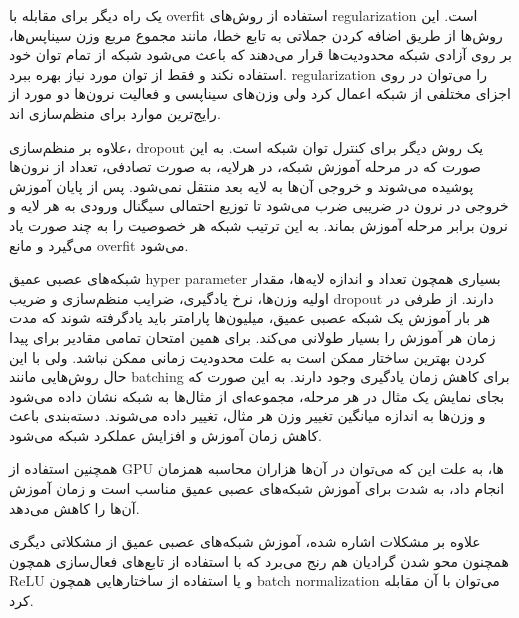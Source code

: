 یک راه دیگر برای مقابله با \gls{overfit} استفاده از روش‌های \gls{regularization}
است. این روش‌ها از طریق اضافه کردن جملاتی به تابع خطا، مانند مجموع مربع وزن
سیناپس‌ها، بر روی آزادی شبکه محدودیت‌ها قرار می‌دهند که باعث می‌شود شبکه از تمام
توان خود استفاده نکند و فقط از توان مورد نیاز بهره ببرد. \gls{regularization} را
می‌توان در روی اجزای مختلفی از شبکه اعمال کرد ولی وزن‌های سیناپسی و فعالیت
نرون‌ها دو مورد از رایج‌ترین موارد برای منظم‌سازی اند.

علاوه بر منظم‌سازی، dropout یک روش دیگر برای کنترل توان شبکه است. به این صورت که
در مرحله آموزش شبکه، در هرلایه، به صورت تصادفی، تعداد از نرون‌ها پوشیده می‌شوند
و خروجی آن‌ها به لایه بعد منتقل نمی‌شود. پس از پایان آموزش خروجی در نرون در
ضریبی ضرب می‌شود تا توزیع احتمالی سیگنال ورودی به هر لایه و نرون برابر مرحله
آموزش بماند. به این ترتیب شبکه‌ هر خصوصیت را به چند صورت یاد می‌گیرد و مانع
\gls{overfit} می‌شود.

شبکه‌های عصبی عمیق \gls{hyper parameter} بسیاری همچون تعداد و اندازه لایه‌ها،
مقدار اولیه وزن‌ها، نرخ یادگیری، ضرایب منظم‌سازی و ضریب dropout دارند. از طرفی
در هر بار آموزش یک شبکه عصبی عمیق، میلیون‌ها پارامتر باید یادگرفته شوند که مدت
زمان هر آموزش را بسیار طولانی می‌کند. برای همین امتحان تمامی مقادیر برای پیدا
کردن بهترین ساختار ممکن است به علت محدودیت زمانی ممکن نباشد. ولی با این حال
روش‌هایی مانند \gls{batching} برای کاهش زمان یادگیری وجود دارند. به این صورت که
بجای نمایش یک مثال در هر مرحله، مجموعه‌ای از مثال‌‌ها به شبکه نشان داده می‌شود و
وزن‌ها به اندازه میانگین تغییر وزن هر مثال، تغییر داده می‌شوند. دسته‌بندی باعث
کاهش زمان آموزش و افزایش عملکرد شبکه می‌شود.

همچنین استفاده از \gls{GPU} ها، به علت این که می‌توان در آن‌ها هزاران محاسبه همزمان
انجام داد، به شدت برای آموزش شبکه‌های عصبی عمیق مناسب است و زمان آموزش آن‌ها را
کاهش می‌دهد.

علاوه بر مشکلات اشاره شده، آموزش شبکه‌های عصبی عمیق از مشکلاتی دیگری همچنون محو
شدن گرادیان‌ هم رنج می‌برد که با استفاده از تابع‌های فعال‌سازی همچون ReLU و یا
استفاده از ساختارهایی همچون \gls{batch normalization} می‌توان با آن مقابله کرد.

